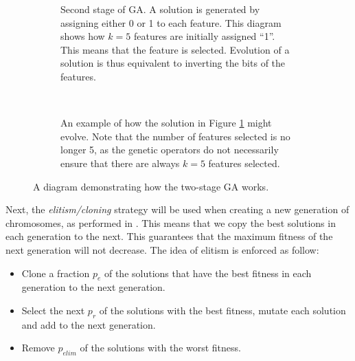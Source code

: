 \documentclass[12pt, twoside, a4paper]{report}
\begin{document}
\begin{figure}
\begin{subfigure}[b]{\textwidth}
\centering
{}
\caption{Second stage of GA. A solution is generated by assigning either 0 or 1 to each feature. This diagram shows how $k=5$ features are initially assigned ``1''. This means that the feature is selected. Evolution of a solution is thus equivalent to inverting the bits of the features.}
\label{bg:ga:twostage_b}
\end{subfigure} \\[2em]

\begin{subfigure}[b]{\textwidth}
\centering
{}
\caption{An example of how the solution in Figure \ref{bg:ga:twostage_b} might evolve. Note that the number of features selected is no longer 5, as the genetic operators do not necessarily ensure that there are always $k=5$ features selected.}
\label{bg:ga:twostage_c}
\end{subfigure}

\caption{A diagram demonstrating how the two-stage GA works.}
\label{bg:ga:twostage:diag}
\end{figure}


Next, the \textit{elitism/cloning} strategy will be used when creating a new generation of chromosomes, as performed in \cite{RefWorks:212}. This means that we copy the best solutions in each generation to the next. This guarantees that the maximum fitness of the next generation will not decrease. The idea of elitism is enforced as follow:
\begin{itemize}
  \item Clone a fraction $p_e$ of the solutions that have the best fitness in each generation to the next generation.
  \item Select the next $p_r$ of the solutions with the best fitness, mutate each solution and add to the next generation.
  \item Remove $p_{elim}$ of the solutions with the worst fitness.
\end{itemize}
\end{document}
